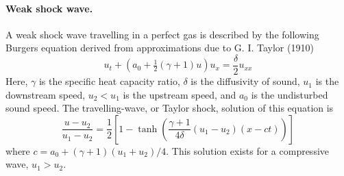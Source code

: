 \paragraph{Weak shock wave.} A weak shock wave travelling in a perfect gas is described by the following Burgers equation derived from approximations due to G. I. Taylor (1910)
\begin{equation}
u_t + \left(a_0 + \tfrac12(\gamma + 1)u\right) u_x = \frac{\delta}{2}u_{xx}
\end{equation}
Here, $\gamma$ is the specific heat capacity ratio, $\delta$ is the diffusivity of sound, $u_1$ is the downstream speed, $u_2 < u_1$ is the upstream speed, and $a_0$ is the undisturbed sound speed.  The  travelling-wave, or Taylor shock, solution of this equation is
\begin{equation}
\frac{u - u_2}{u_1-u_2} = \frac12\left[ 1 -\tanh\left( \frac{\gamma+1}{4\delta}(u_1-u_2)(x-ct) \right) \right]
\end{equation}
where $c = a_0 + (\gamma+1)(u_1+u_2)/4$. This solution exists for a compressive wave, $u_1 > u_2$.



